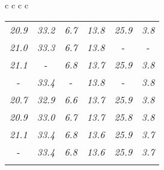 \documentclass[sigplan,screen]{acmart}
\makeatletter
\newcommand{\ccell}[3][]{%
  \kern-\fboxsep
  \if\relax\detokenize{#1}\relax
    \expandafter\@firstoftwo
  \else
    \expandafter\@secondoftwo
  \fi
  {\colorbox{#2}}%
  {\colorbox[#1]{#2}}%
  {#3}\kern-\fboxsep
}
\makeatother
\begin{document}
\begin{table*}
\begin{tabular}{c c c c}
\begin{tabular}{c c c c c c}
      \textit{20.9} & \textit{33.2} & \textit{6.7} & \textit{13.8} & \textit{25.9} & \textit{3.8} \\
      \textit{21.0} & \textit{33.3} & \textit{6.7} & \textit{13.8} &  \ccell[gray]{0.9}{\textit{26.0}} &  \ccell[gray]{0.9}{\textit{3.9}} \\
      \textit{21.1} &  \ccell[gray]{0.9}{\textit{33.5}} & \textit{6.8} & \textit{13.7} & \textit{25.9} & \textit{3.8} \\
       \ccell[gray]{0.9}{\textit{21.2}} & \textit{33.4} &  \ccell[gray]{0.9}{\textit{6.9}} & \textit{13.8} &  \ccell[gray]{0.9}{\textit{26.0}} & \textit{3.8} \\
      \textit{20.7} & \textit{32.9} & \textit{6.6} & \textit{13.7} & \textit{25.9} & \textit{3.8} \\
      \textit{20.9} & \textit{33.0} & \textit{6.7} & \textit{13.7} & \textit{25.8} & \textit{3.8} \\
      \textit{21.1} & \textit{33.4} & \textit{6.8} & \textit{13.6} & \textit{25.9} & \textit{3.7} \\
       \ccell[gray]{0.9}{\textit{21.2}} & \textit{33.4} & \textit{6.8} & \textit{13.6} & \textit{25.9} & \textit{3.7} \\
       
       
      \rule{0pt}{4ex}    
      

\end{tabular}
\end{tabular}
\end{table*}
\end{document}
